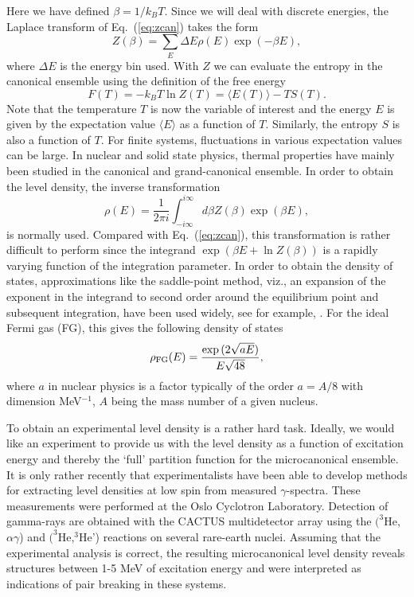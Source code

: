 \documentclass[rmp,aps,floatfix]{revtex4}
\begin{document}
Here we have defined $\beta=1/k_BT$. Since we will 
deal with discrete energies, the 
Laplace transform of Eq.\ (\ref{eq:zcan}) takes the form
\begin{equation}
         Z(\beta)=\sum_E \Delta E\rho(E)\exp{(-\beta E)},
         \label{eq:zactual}
\end{equation}
where $\Delta E$ is the energy bin used.
With $Z$ we can evaluate the 
entropy in the canonical ensemble using the definition of the 
free energy 
\begin{equation}
     F(T)= -k_B T \ln Z(T)=\langle E(T)\rangle - TS(T).
\end{equation}
Note that the temperature $T$ is now the variable of 
interest and the energy $E$ is given by the expectation 
value $\langle E\rangle$ as a function of $T$. Similarly, 
the entropy $S$ is also a function of $T$.
For finite systems, fluctuations in various 
expectation values can be large.
In nuclear and solid state physics, thermal properties have 
mainly been studied in the canonical and grand-canonical ensemble. 
In order to obtain the level density, the inverse transformation 
\begin{equation}
      \rho(E) =\frac{1}{2\pi i}\int_{-i\infty}^{i\infty}
 d\beta Z(\beta) \exp{(\beta E)},
      \label{eq:zbigcan}
\end{equation}
is normally used. Compared with Eq.\ (\ref{eq:zcan}), this 
transformation is rather difficult to perform since 
the integrand $\exp{\left(\beta E+ \ln Z(\beta)\right)}$ is a 
rapidly varying function of the integration parameter. In order to obtain 
the density of states, approximations like the saddle-point 
method, viz., an expansion of the exponent in the integrand 
to second order around the equilibrium point and subsequent integration, 
have been used widely,
see for example,  \cite{kdl97,yoram,WK00}. 
For the ideal Fermi gas (FG), this gives the following density of states
\begin{equation}
      \rho_{\rm FG}(E)=\frac{\exp{(2\sqrt{aE})}}{E\sqrt{48}},
      \label{eq:omegaideal}
\end{equation}
where $a$ in nuclear physics is a factor 
typically of the order $a=A/8$ with dimension 
MeV$^{-1}$, $A$ being the mass number of a given nucleus. 



To obtain an experimental level density is a rather hard task.
Ideally, we would like an experiment to provide us with the level 
density as a function of excitation energy and thereby 
the `full' partition function for the microcanonical ensemble. 
It is only rather recently that 
experimentalists have been able to develop methods 
\cite{oslo1,oslo2} for extracting level densities at low spin from
measured $\gamma$-spectra. 
These measurements were performed at the Oslo 
Cyclotron Laboratory. Detection of gamma-rays are obtained with the
CACTUS multidetector array \cite{oslo3} using the $(^3$He,$\alpha \gamma$)
and $(^3$He,$^3$He')
reactions on several rare-earth nuclei.
Assuming that the
experimental analysis is correct,   
the resulting microcanonical 
level density reveals structures between 1-5 MeV of excitation energy
and were interpreted as indications of pair breaking in these systems. 
\end{document}
